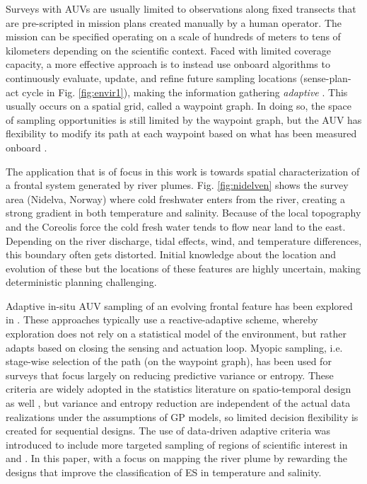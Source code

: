 \documentclass[aoas]{imsart}
\begin{document}
Surveys with AUVs are usually limited to observations along fixed transects that are pre-scripted in mission plans created manually by a human operator. The mission can be specified operating on a scale of hundreds of meters to tens of kilometers depending on the scientific context. Faced with limited coverage capacity, a more effective approach is to instead use onboard algorithms to continuously evaluate, update, and refine future sampling locations (sense-plan-act cycle in Fig. \ref{fig:envir1}), making the information gathering \emph{adaptive} \citep{das11b,Das2015,fossuminformation,fossum18b}. This usually occurs on a spatial grid, called a waypoint graph. In doing so, the space of sampling opportunities is still limited by the waypoint graph, but the AUV has flexibility to modify its path at each waypoint based on what has been measured onboard \citep{py10,Rajan12,Rajan12b}.

The application that is of focus in this work is towards spatial characterization of a frontal system generated by river plumes. Fig. \ref{fig:nidelven} shows the survey area (Nidelva, Norway) where cold freshwater enters from the river, creating a strong gradient in both temperature and salinity. Because of the local topography and the Coreolis force %
the cold fresh water tends to flow near
land to the east. Depending on the river discharge, tidal effects, wind, and temperature differences, this boundary often gets distorted. Initial knowledge about the location and evolution of these but the locations of these features are highly uncertain, making deterministic planning challenging. 

Adaptive in-situ AUV sampling of an evolving frontal feature has been explored in \cite{fronts11,Zhang2012,Pinto2018,costa19}. These approaches typically use a reactive-adaptive scheme, whereby exploration does not rely on a statistical model of the environment, but rather adapts based on closing the sensing and actuation loop. Myopic sampling, i.e. stage-wise selection of the path (on the waypoint graph), has been used for surveys \citep{singh2009efficient,Binney2013} that focus largely on reducing predictive variance or entropy. These criteria are widely adopted in the statistics literature on spatio-temporal design as well \cite{bueso1998state,zidek2019monitoring}, but variance and entropy reduction are independent of the actual data realizations under the assumptions of GP models, so limited decision flexibility is created for sequential designs. The use of data-driven adaptive criteria was introduced to include more targeted sampling of regions of scientific interest in \cite{Low2009} and \cite{fossuminformation}. In this paper, with a focus on mapping the river plume by rewarding the designs that improve the classification of ES in temperature and salinity.
\end{document}
